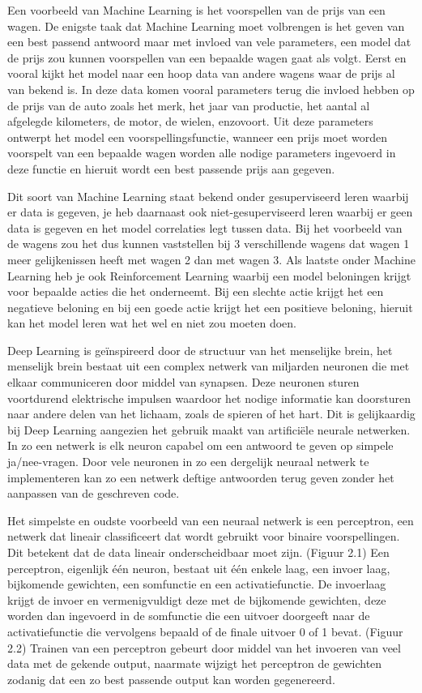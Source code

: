 Een voorbeeld van Machine Learning is het voorspellen van de prijs van een wagen.
De enigste taak dat Machine Learning moet volbrengen is het geven van een best passend antwoord maar met invloed van vele parameters, een model dat de prijs zou kunnen voorspellen van een bepaalde wagen gaat als volgt.
Eerst en vooral kijkt het model naar een hoop data van andere wagens waar de prijs al van bekend is. 
In deze data komen vooral parameters terug die invloed hebben op de prijs van de auto zoals het merk, het jaar van productie, het aantal al afgelegde kilometers, de motor, de wielen, enzovoort. 
Uit deze parameters ontwerpt het model een voorspellingsfunctie, wanneer een prijs moet worden voorspelt van een bepaalde wagen worden alle nodige parameters ingevoerd in deze functie en hieruit wordt een best passende prijs aan gegeven.

Dit soort van Machine Learning staat bekend onder gesuperviseerd leren waarbij er data is gegeven, je heb daarnaast ook niet-gesuperviseerd leren waarbij er geen data is gegeven en het model correlaties legt tussen data.
Bij het voorbeeld van de wagens zou het dus kunnen vaststellen bij 3 verschillende wagens dat wagen 1 meer gelijkenissen heeft met wagen 2 dan met wagen 3.
Als laatste onder Machine Learning heb je ook Reinforcement Learning waarbij een model beloningen krijgt voor bepaalde acties die het onderneemt. Bij een slechte actie krijgt het een negatieve beloning en bij een goede actie krijgt het een positieve beloning, hieruit kan het model leren wat het wel en niet zou moeten doen.

Deep Learning is geïnspireerd door de structuur van het menselijke brein, het menselijk brein bestaat uit een complex netwerk van miljarden neuronen die met elkaar communiceren door middel van synapsen.
Deze neuronen sturen voortdurend elektrische impulsen waardoor het nodige informatie kan doorsturen naar andere delen van het lichaam, zoals de spieren of het hart.
Dit is gelijkaardig bij Deep Learning aangezien het gebruik maakt van artificiële neurale netwerken. In zo een netwerk is elk neuron capabel om een antwoord te geven op simpele ja/nee-vragen. Door vele neuronen in zo een dergelijk neuraal netwerk te implementeren kan zo een netwerk deftige antwoorden terug geven zonder het aanpassen van de geschreven code.

Het simpelste en oudste voorbeeld van een neuraal netwerk is een perceptron, een netwerk dat lineair classificeert dat wordt gebruikt voor binaire voorspellingen. Dit betekent dat de data lineair onderscheidbaar moet zijn. (Figuur 2.1)
Een perceptron, eigenlijk één neuron, bestaat uit één enkele laag, een invoer laag, bijkomende gewichten, een somfunctie en een activatiefunctie.
De invoerlaag krijgt de invoer en vermenigvuldigt deze met de bijkomende gewichten, deze worden dan ingevoerd in de somfunctie die een uitvoer doorgeeft naar de activatiefunctie die vervolgens bepaald of de finale uitvoer 0 of 1 bevat. (Figuur 2.2)
Trainen van een perceptron gebeurt door middel van het invoeren van veel data met de gekende output, naarmate wijzigt het perceptron de gewichten zodanig dat een zo best passende output kan worden gegenereerd.


